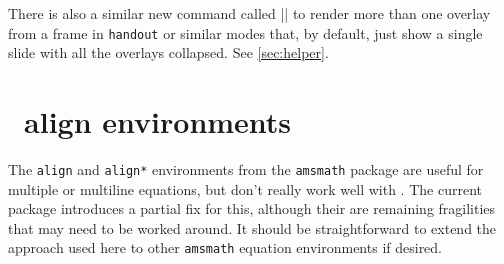 \documentclass[a4paper]{ltxdoc}
\begin{document}
There is also a similar new command called |\handoutframe| to render more than
one overlay from a frame in \texttt{handout} or similar modes that, by default,
just show a single slide with all the overlays collapsed.  See \cref{sec:helper}.


\section{\AmSTeX\ align environments}

The \texttt{align} and \texttt{align*} environments from the \texttt{amsmath}
package are useful for multiple or multiline equations, but don't really work
well with \beamer.  The current package introduces a partial fix for this,
although their are remaining fragilities that may need to be worked around.  It
should be straightforward to extend the approach used here to other
\texttt{amsmath} equation environments if desired.
\end{document}

